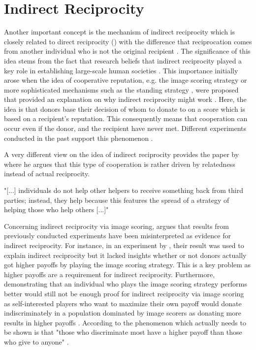 \documentclass[sigconf]{acmart}
\begin{document}
    \section{Indirect Reciprocity}\label{sec:indirect_reciprocity}
    Another important concept is the mechanism of indirect reciprocity which is closely related to direct reciprocity () with the difference that reciprocation comes from another individual who is not the original recipient \cite{alexander_biology_1987,boyd_evolution_1989}.
    The significance of this idea stems from the fact that research beliefs that indirect reciprocity played a key role in establishing large-scale human societies \cite{roberts_kin_2019}.
    This importance initially arose when the idea of cooperative reputation, e.g. the image scoring strategy or more sophisticated mechanisms such as the standing strategy \cite{leimar_evolution_2001,ohtsuki_leading_2006}, were proposed that provided an explanation on why indirect reciprocity might work \cite{nowak_evolution_1998}.
    Here, the idea is that donors base their decision of whom to donate to on a score which is based on a recipient's reputation.
    This consequently means that cooperation can occur even if the donor, and the recipient have never met.
    Different experiments conducted in the past support this phenomenon \cite{nowak_five_2006, milinski_cooperation_2002, milinski_reputation_2002,milinski_reputation_2016}.

    A very different view on the idea of indirect reciprocity provides the paper by \citeauthor{roberts_kin_2019} \cite{roberts_kin_2019} where he argues that this type of cooperation is rather driven by relatedness instead of actual reciprocity.

    "[...] individuals do not help other helpers to receive something back from third parties; instead, they help because this features the spread of a strategy of helping those who help others [...]" \cite{roberts_kin_2019}


    Concerning indirect reciprocity via image scoring, \citeauthor{roberts_kin_2019} argues that results from previously conducted experiments have been misinterpreted as evidence for indirect reciprocity.
    For instance, in an experiment by \citeauthor{milinski_reputation_2002} \cite{milinski_reputation_2002}, their result was used to explain indirect reciprocity but it lacked insights whether or not donors actually got higher payoffs by playing the image scoring strategy.
    This is a key problem as higher payoffs are a requirement for indirect reciprocity.
    Furthermore, demonstrating that an individual who plays the image scoring strategy performs better would still not be enough proof for indirect reciprocity via image scoring as self-interested players who want to maximize their own payoff would donate indiscriminately in a population dominated by image scorers as donating more results in higher payoffs \cite{roberts_kin_2019}.
    According to \citeauthor{roberts_kin_2019} the phenomenon which actually needs to be shown is that "those who discriminate most have a higher payoff than those who give to anyone" \cite{roberts_kin_2019}.
\end{document}
